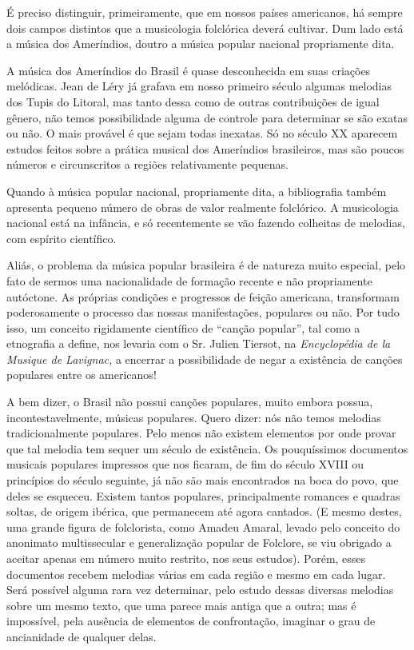 É preciso distinguir, primeiramente, que em nossos países americanos, há
sempre dois campos distintos que a musicologia folclórica deverá
cultivar. Dum lado está a música dos Ameríndios, doutro a música popular
nacional propriamente dita.

A música dos Ameríndios do Brasil é quase desconhecida em suas criações
melódicas. Jean de Léry já grafava em nosso primeiro século algumas
melodias dos Tupis do Litoral, mas tanto dessa como de outras
contribuições de igual gênero, não temos possibilidade alguma de
controle para determinar se são exatas ou não. O mais provável é que
sejam todas inexatas. Só no século XX aparecem estudos feitos sobre a
prática musical dos Ameríndios brasileiros, mas são poucos números e
circunscritos a regiões relativamente pequenas.

Quando à música popular nacional, propriamente dita, a bibliografia
também apresenta pequeno número de obras de valor realmente folclórico.
A musicologia nacional está na infância, e só recentemente se vão
fazendo colheitas de melodias, com espírito científico.

Aliás, o problema da música popular brasileira é de natureza muito
especial, pelo fato de sermos uma nacionalidade de formação recente e
não propriamente autóctone. As próprias condições e progressos de feição
americana, transformam poderosamente o processo das nossas
manifestações, populares ou não. Por tudo isso, um conceito rigidamente
científico de ``canção popular'', tal como a etnografia a define, nos
levaria com o Sr. Julien Tiersot, na \emph{Encyclopédia de la Musique de
Lavignac,} a encerrar a possibilidade de negar a existência de canções
populares entre os americanos!

A bem dizer, o Brasil não possui canções populares, muito embora possua,
incontestavelmente, músicas populares. Quero dizer: nós não temos
melodias tradicionalmente populares. Pelo menos não existem elementos
por onde provar que tal melodia tem sequer um século de existência. Os
pouquíssimos documentos musicais populares impressos que nos ficaram, de
fim do século XVIII ou princípios do século seguinte, já não são mais
encontrados na boca do povo, que deles se esqueceu. Existem tantos
populares, principalmente romances e quadras soltas, de origem ibérica,
que permanecem até agora cantados. (E mesmo destes, uma grande figura de
folclorista, como Amadeu Amaral, levado pelo conceito do anonimato
multissecular e generalização popular de Folclore, se viu obrigado a
aceitar apenas em número muito restrito, nos seus estudos). Porém, esses
documentos recebem melodias várias em cada região e mesmo em cada lugar.
Será possível alguma rara vez determinar, pelo estudo dessas diversas
melodias sobre um mesmo texto, que uma parece mais antiga que a outra;
mas é impossível, pela ausência de elementos de confrontação, imaginar o
grau de ancianidade de qualquer delas.


